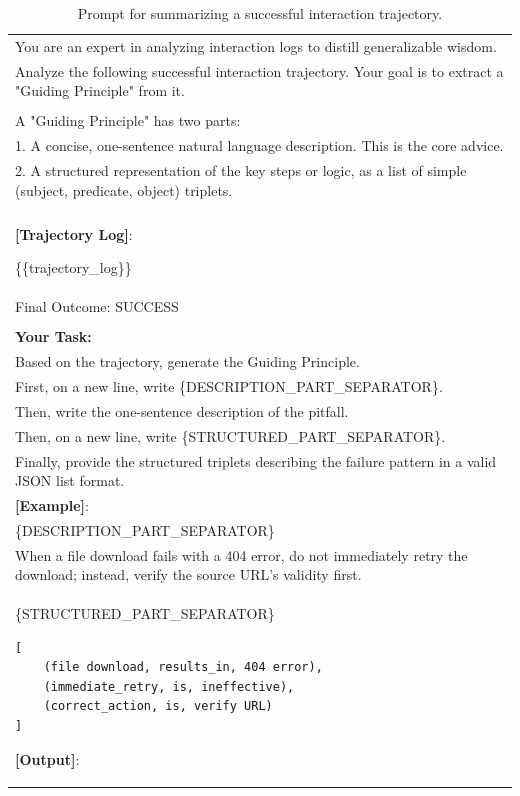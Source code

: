\begin{table}[!h]
  \centering
  \small
  \label{tab:success_distill_prompt}
  \caption{Prompt for summarizing a successful interaction trajectory.}
  \begin{tabular}{p{}}
    \toprule
You are an expert in analyzing interaction logs to distill generalizable wisdom.\\

Analyze the following successful interaction trajectory. Your goal is to extract a "Guiding Principle" from it.\\ \\

A "Guiding Principle" has two parts:\\
1. A concise, one-sentence natural language description. This is the core advice.\\
2. A structured representation of the key steps or logic, as a list of simple (subject, predicate, object) triplets.\\ \\

\textbf{[Trajectory Log]}: 

\{\{trajectory\_log\}\} \\
Final Outcome: SUCCESS\\ \\

\textbf{Your Task:}\\
Based on the trajectory, generate the Guiding Principle.\\
First, on a new line, write \{DESCRIPTION\_PART\_SEPARATOR\}.\\
Then, write the one-sentence description of the pitfall.\\
Then, on a new line, write \{STRUCTURED\_PART\_SEPARATOR\}.\\
Finally, provide the structured triplets describing the failure pattern in a valid JSON list format.\\[0.5em]

\textbf{[Example]}:\\
\{DESCRIPTION\_PART\_SEPARATOR\}\\
When a file download fails with a 404 error, do not immediately retry the download; instead, verify the source URL's validity first.\\
\{STRUCTURED\_PART\_SEPARATOR\}  
\begin{verbatim}
[
    (file download, results_in, 404 error),
    (immediate_retry, is, ineffective),
    (correct_action, is, verify URL)
]
\end{verbatim}
\textbf{[Output]}:\\
    \bottomrule
  \end{tabular}
\end{table}


